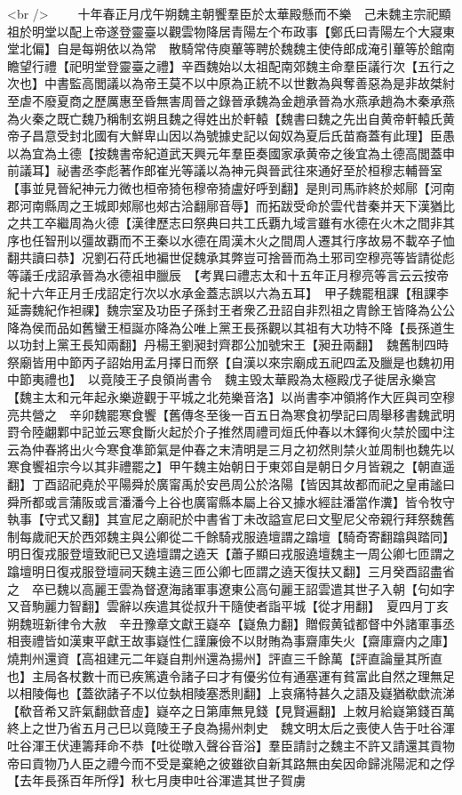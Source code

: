 <br />
　　十年春正月戊午朔魏主朝饗羣臣於太華殿懸而不樂　己未魏主宗祀顯祖於明堂以配上帝遂登靈臺以觀雲物降居青陽左个布政事【鄭氏曰青陽左个大寢東堂北偏】自是每朔依以為常　散騎常侍庾蓽等聘於魏魏主使侍郎成淹引蓽等於館南瞻望行禮【祀明堂登靈臺之禮】辛酉魏始以太祖配南郊魏主命羣臣議行次【五行之次也】中書監高閭議以為帝王莫不以中原為正統不以世數為與奪善惡為是非故桀紂至虐不廢夏商之歷厲惠至昏無害周晉之錄晉承魏為金趙承晉為水燕承趙為木秦承燕為火秦之既亡魏乃稱制玄朔且魏之得姓出於軒轅【魏書曰魏之先出自黄帝軒轅氏黄帝子昌意受封北國有大鮮卑山因以為號據史記以匈奴為夏后氏苗裔蓋有此理】臣愚以為宜為土德【按魏書帝紀道武天興元年羣臣奏國家承黄帝之後宜為土德高閭蓋申前議耳】祕書丞李彪著作郎崔光等議以為神元與晉武往來通好至於桓穆志輔晉室【事並見晉紀神元力微也桓帝猗㐌穆帝猗盧好呼到翻】是則司馬祚終於郟鄏【河南郡河南縣周之王城即郟鄏也郟古洽翻鄏音辱】而拓跋受命於雲代昔秦并天下漢猶比之共工卒繼周為火德【漢律歷志曰祭典曰共工氏覇九域言雖有水德在火木之間非其序也任智刑以彊故覇而不王秦以水德在周漢木火之間周人遷其行序故易不載卒子恤翻共讀曰恭】况劉石苻氏地褊世促魏承其弊豈可捨晉而為土邪司空穆亮等皆請從彪等議壬戌詔承晉為水德祖申臘辰　【考異曰禮志太和十五年正月穆亮等言云云按帝紀十六年正月壬戌詔定行次以水承金蓋志誤以六為五耳】　甲子魏罷租課【租課李延壽魏紀作袒祼】魏宗室及功臣子孫封王者衆乙丑詔自非烈祖之胄餘王皆降為公公降為侯而品如舊蠻王桓誕亦降為公唯上黨王長孫觀以其祖有大功特不降【長孫道生以功封上黨王長知兩翻】丹楊王劉昶封齊郡公加號宋王【昶丑兩翻】　魏舊制四時祭廟皆用中節丙子詔始用孟月擇日而祭【自漢以來宗廟成五祀四孟及臘是也魏初用中節夷禮也】　以竟陵王子良領尚書令　魏主毁太華殿為太極殿戊子徙居永樂宫【魏主太和元年起永樂遊觀于平城之北苑樂音洛】以尚書李冲領將作大匠與司空穆亮共營之　辛卯魏罷寒食饗【舊傳冬至後一百五日為寒食初學記曰周舉移書魏武明罸令陸翽鄴中記並云寒食斷火起於介子推然周禮司烜氏仲春以木鐸徇火禁於國中注云為仲春將出火今寒食凖節氣是仲春之末清明是三月之初然則禁火並周制也魏先以寒食饗祖宗今以其非禮罷之】甲午魏主始朝日于東郊自是朝日夕月皆親之【朝直遥翻】丁酉詔祀堯於平陽舜於廣甯禹於安邑周公於洛陽【皆因其故都而祀之皇甫謐曰舜所都或言蒲阪或言潘潘今上谷也廣甯縣本屬上谷又據水經註潘當作瀵】皆令牧守執事【守式又翻】其宣尼之廟祀於中書省丁未改謚宣尼曰文聖尼父帝親行拜祭魏舊制每歲祀天於西郊魏主與公卿從二千餘騎戎服遶壇謂之蹹壇【騎奇寄翻蹹與踏同】明日復戎服登壇致祀已又遶壇謂之遶天【蕭子顯曰戎服遶壇魏主一周公卿七匝謂之蹹壇明日復戎服登壇祠天魏主遶三匝公卿七匝謂之遶天復扶又翻】三月癸酉詔盡省之　卒已魏以高麗王雲為督遼海諸軍事遼東公高句麗王詔雲遣其世子入朝【句如字又音駒麗力智翻】雲辭以疾遣其從叔升干隨使者詣平城【從才用翻】　夏四月丁亥朔魏班新律令大赦　辛丑豫章文獻王嶷卒【嶷魚力翻】贈假黄钺都督中外諸軍事丞相喪禮皆如漢東平獻王故事嶷性仁謹廉儉不以財賄為事齋庫失火【齋庫齋内之庫】燒荆州還資【高祖建元二年嶷自荆州還為揚州】評直三千餘萬【評直論量其所直也】主局各杖數十而已疾篤遺令諸子曰才有優劣位有通塞運有貧富此自然之理無足以相陵侮也【蓋欲諸子不以位埶相陵塞悉則翻】上哀痛特甚久之語及嶷猶欷歔流涕【欷音希又許氣翻歔音虛】嶷卒之日第庫無見錢【見賢遍翻】上敇月給嶷第錢百萬終上之世乃省五月己巳以竟陵王子良為揚州刺史　魏文明太后之喪使人告于吐谷渾吐谷渾王伏連籌拜命不恭【吐從暾入聲谷音浴】羣臣請討之魏主不許又請還其貢物帝曰貢物乃人臣之禮今而不受是棄絶之彼雖欲自新其路無由矣因命歸洮陽泥和之俘【去年長孫百年所俘】秋七月庚申吐谷渾遣其世子賀虜